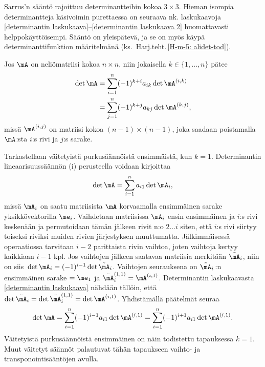 Sarrus'n sääntö rajoittuu determinantteihin kokoa $3 \times 3$. Hieman isompia determinantteja
käsivoimin purettaessa on seuraava nk.  laskukaavoja 
\eqref{determinantin laskukaava}--\eqref{determinantin laskukaava 2} huomattavasti
helppokäyttöisempi. Sääntö on yleispätevä, ja se on myös käypä determinanttifunktion
määritelmänä (ks.\ Harj.teht.\,\ref{H-m-5: alidet-tod}).
\begin{Lause} \label{alideterminanttisääntö} 
 Jos $\mA$ on neliömatriisi kokoa $n \times n$, niin jokaisella 
$k \in \{1, \ldots, n\}$ pätee
\begin{align*}
\det\mA &= \sum_{i=1}^n (-1)^{k+i} a_{ik} \det\mA^{(i,k)} \\
        &= \sum_{j=1}^n (-1)^{k+j} a_{kj} \det\mA^{(k,j)},
\end{align*}
missä $\mA^{(i,j)}$ on matriisi kokoa $(n-1) \times (n-1)$, joka saadaan poistamalla $\mA$:sta
$i$:s rivi ja $j$:s sarake.
\end{Lause}
\tod Tarkastellaan väitetyistä purkusäännöistä ensimmäistä, kun $k=1$. Determinantin
lineaarisuussäännön (i) perusteella voidaan kirjoittaa
\[
\det\mA = \sum_{i=1}^n a_{i1} \det\mA_i,
\]
missä $\mA_i$ on saatu matriisista $\mA$ korvaamalla ensimmäinen sarake yksikkövektorilla
$\me_i$. Vaihdetaan matriisissa $\mA_i$ ensin ensimmäinen ja $i$:s rivi keskenään ja 
permutoidaan tämän jälkeen rivit n:o $2 \ldots i$ siten, että $i$:s rivi siirtyy toiseksi
riviksi muiden rivien järjestyksen muuttumatta. Jälkimmäisessä operaatiossa tarvitaan $i-2$
parittaista rivin vaihtoa, joten vaihtoja kertyy kaikkiaan $i-1$ kpl. Jos vaihtojen jälkeen
saatavaa matriisia merkitään $\tilde{\mA}_i$, niin on siis 
$\,\det\mA_i=(-1)^{i-1}\det\tilde{\mA}_i$. Vaihtojen seurauksena on $\tilde{\mA}_i\,$:n 
ensimmäinen sarake $=\me_1$ ja $\tilde{\mA}_i^{(1,1)}=\mA^{(i,1)}$. Determinantin laskukaavasta
\eqref{determinantin laskukaava} nähdään tällöin, että 
$\det\tilde{\mA}_i=\det\tilde{\mA}_i^{(1,1)}=\det\mA^{(i,1)}$. Yhdistämällä päätelmät seuraa
\[ 
\det\mA = \sum_{i=1}^n (-1)^{i-1} a_{i1}\det\mA^{(i,1)} 
        = \sum_{i=1}^n (-1)^{i+1} a_{i1}\det\mA^{(i,1)}.
\]
Väitetyistä purkusäännöistä ensimmäinen on näin todistettu tapauksessa $k=1$. Muut väitetyt
säännöt palautuvat tähän tapaukseen vaihto- ja transponointisääntöjen avulla. \loppu

